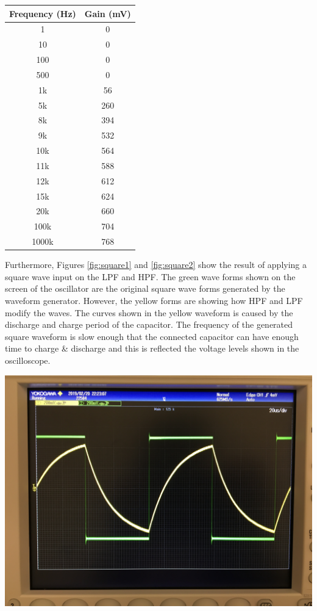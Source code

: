 \documentclass[journal]{IEEEtran}
\begin{document}
\vspace{15mm}

\begingroup
    \medskip
    \centering
    \def\arraystretch{1.5}
    \begin{tabular}{cc}
    \hline
    Frequency (Hz) & Gain (mV) \\
    \hline
    1 & 0 \\
    10 & 0 \\
    100 & 0 \\
    500 & 0 \\
    1k & 56 \\
    5k & 260 \\
    8k & 394 \\
    9k & 532 \\
    10k & 564 \\
    11k & 588 \\
    12k & 612 \\
    15k & 624 \\
    20k & 660 \\
    100k & 704 \\
    1000k & 768 \\
    \hline
    \end{tabular}
    \label{fig:tableHPF}
    \medskip
\endgroup

\noindent Furthermore, Figures \ref{fig:square1} and \ref{fig:square2} show the result of applying a square wave input on the LPF and HPF. The green wave forms shown on the screen of the oscillator are the original square wave forms generated by the waveform generator. However, the yellow forms are showing how HPF and LPF modify the waves. The curves shown in the yellow waveform is caused by the discharge and charge period of the capacitor. The frequency of the generated square waveform is slow enough that the connected capacitor can have enough time to charge & discharge and this is reflected the voltage levels shown in the oscilloscope.

\begingroup
    \medskip
    \centering
    \includegraphics[width=\columnwidth]{images/lab4_1.jpg}
    \label{fig:square1}
    \medskip
\endgroup
\end{document}
